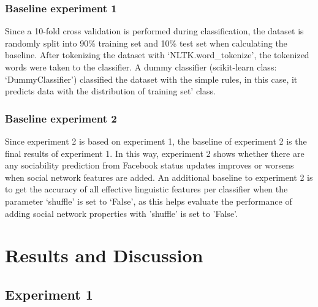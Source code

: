 \documentclass[
10pt, %
a4paper, %
oneside, %
headinclude,footinclude, %
] {book}%
\begin{document}
\subsection{Baseline experiment 1}
Since a 10-fold cross validation is performed during classification, the dataset is randomly split into 90\% training set and 10\% test set when calculating the baseline. After tokenizing the dataset with ‘NLTK.word\_tokenize’, the tokenized words were taken to the classifier.  A dummy classifier (scikit-learn class: ‘DummyClassifier’) classified the dataset with the simple rules, in this case, it predicts data with the distribution of training set’ class. 

\subsection{Baseline experiment 2}
Since experiment 2 is based on experiment 1, the baseline of experiment 2 is the final results of experiment 1. In this way, experiment 2 shows whether there are any sociability prediction from Facebook status updates improves or worsens when social network features are added. An additional baseline to experiment 2 is to get the accuracy of all effective linguistic features per classifier when the parameter ‘shuffle’ is set to ‘False’, as this helps evaluate the performance of adding social network properties with 'shuffle' is set to 'False'. 

\chapter{Results and Discussion}

\section{Experiment 1}
\end{document}
